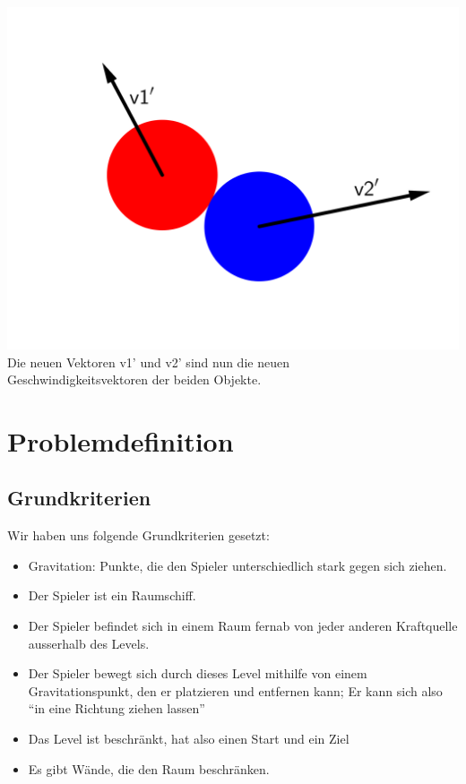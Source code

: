 \documentclass[12pt,a4paper]{scrartcl}
\newcommand{\q}[1]{``#1''}
\begin{document}
\begin{center}
\includegraphics[scale=0.8]{img/Elastischer_stoss_5.png} \\
Die neuen Vektoren v1' und v2' sind nun die neuen\\ Geschwindigkeitsvektoren der beiden Objekte.
\end{center}

\section{Problemdefinition}
\subsection{Grundkriterien}
Wir haben uns folgende Grundkriterien gesetzt:
\begin{itemize}
\item Gravitation: Punkte, die den Spieler unterschiedlich stark gegen sich ziehen.
\item Der Spieler ist ein Raumschiff.
\item Der Spieler befindet sich in einem Raum fernab von jeder anderen Kraftquelle ausserhalb des Levels.
\item Der Spieler bewegt sich durch dieses Level mithilfe von  einem Gravitationspunkt, den er platzieren und entfernen kann; Er kann sich also \q{in eine Richtung ziehen lassen}
\item Das Level ist beschränkt, hat also einen Start und ein Ziel
\item Es gibt Wände, die den Raum beschränken.
\end{itemize}
\end{document}
